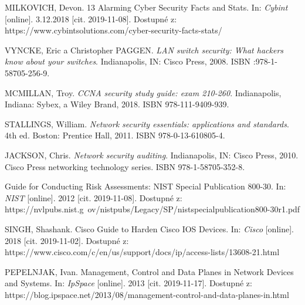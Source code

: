

\begin{literatura}{99}
MILKOVICH, Devon. 13 Alarming Cyber Security Facts and Stats. In: \textit{Cybint} [online]. 3.12.2018 [cit. 2019-11-08]. Dostupné z: https://www.cybintsolutions.com/cyber-security-facts-stats/

VYNCKE, Eric a Christopher PAGGEN. \textit{LAN switch security: What hackers know about your switches}. Indianapolis, IN: Cisco Press, 2008. ISBN :978-1-58705-256-9.	
	
MCMILLAN, Troy. \textit{CCNA security study guide: exam 210-260}. Indianapolis, Indiana: Sybex, a Wiley Brand, 2018. ISBN 978-111-9409-939.
	
STALLINGS, William. \textit{Network security essentials: applications and standards}. 4th ed. Boston: Prentice Hall, 2011. ISBN 978-0-13-610805-4.

JACKSON, Chris. \textit{Network security auditing}. Indianapolis, IN: Cisco Press, 2010. Cisco Press networking technology series. ISBN 978-1-58705-352-8.

Guide for Conducting Risk Assessments: NIST Special Publication 800-30. In: \textit{NIST} [online]. 2012 [cit. 2019-11-08]. Dostupné z: https://nvlpubs.nist.g\
ov/nistpubs/Legacy/SP/nistspecialpublication800-30r1.pdf

SINGH, Shashank. Cisco Guide to Harden Cisco IOS Devices. In: \textit{Cisco} [online]. 2018 [cit. 2019-11-02]. Dostupné z: https://www.cisco.com/c/en/us/support/docs/ip/access-lists/13608-21.html	
	
PEPELNJAK, Ivan. Management, Control and Data Planes in Network Devices and Systems. In: \textit{IpSpace} [online]. 2013 [cit. 2019-11-17]. Dostupné z: https://blog.ipspace.net/2013/08/management-control-and-data-planes-in.html
	
	
	

\end{literatura}
